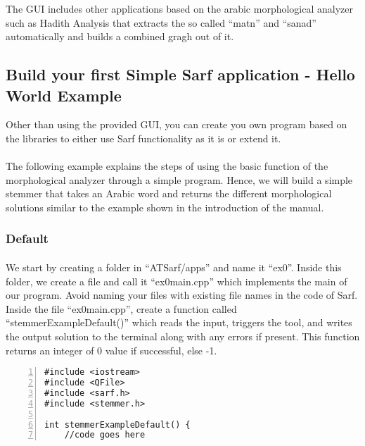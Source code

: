 \documentclass{article}
\begin{document}
The GUI includes other applications based on the arabic morphological analyzer such as Hadith Analysis that extracts the so called ``matn'' and ``sanad'' automatically and builds a combined gragh out of it. 


\subsection{Build your first Simple Sarf application - Hello World Example}
\label{subsec:hwex}

Other than using the provided GUI, you can create you own program based on the libraries to either use Sarf functionality as it is or extend it.

\paragraph{}
The following example explains the steps of using the basic function of the morphological analyzer through a simple program. Hence, we will build a simple stemmer that takes an Arabic word and returns the different morphological solutions similar to the example shown in the introduction of the manual.

\subsubsection{Default}
\label{subsubsec:default}

\paragraph{}
We start by creating a folder in ``ATSarf/apps'' and name it ``ex0''. Inside this folder, we create a file and call it ``ex0main.cpp'' which implements the main of our program. Avoid naming your files with existing file names in the code of Sarf. Inside the file ``ex0main.cpp'', create a function called ``stemmerExampleDefault()'' which reads the input, triggers the tool, and writes the output solution to the terminal along with any errors if present. This function returns an integer of 0 value if successful, else -1.

\begin{Verbatim}[numbers=left]
#include <iostream>
#include <QFile>
#include <sarf.h>
#include <stemmer.h>

int stemmerExampleDefault() {
	//code goes here
\end{Verbatim}
\end{document}
